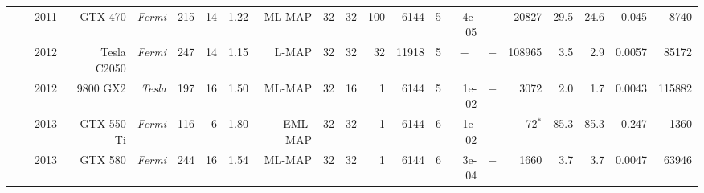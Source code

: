 \begin{table}
\begin{adjustbox}{angle=90}
{{\begin{tabular}{|r|r|r||r|r|r|r|r|r|r|r|r|r|r||r|r|r|r||r|r|r|}
                                                                 & \cite{Wu2011}                         & 2011                  & GTX 470                  & \textit{Fermi}                   & 215                  & 14                 & 1.22                   &  ML-MAP                  & 32                  & 32                  & 100                 & 6144                  & 5                  & 4e-05                         & \multicolumn{1}{c|}{$-$} &  20827        &   29.5           &  24.6          & 0.045         &   8740             \\ \cline{2-21}
                                                                 & \cite{Chinnici2012}                   & 2012                  & Tesla C2050              & \textit{Fermi}                   & 247                  & 14                 & 1.15                   &   L-MAP                  & 32                  & 32                  & 32                  & 11918                 & 5                  & \multicolumn{1}{c|}{$-$}      & \multicolumn{1}{c|}{$-$} & 108965        &    3.5           &   2.9          & 0.0057        &  85172             \\ \cline{2-21}
                                                                 & \cite{Yoge2012}                       & 2012                  & 9800 GX2                 & \textit{Tesla}                   & 197                  & 16                 & 1.50                   &  ML-MAP                  & 32                  & 16                  & 1                   & 6144                  & 5                  & 1e-02                         & \multicolumn{1}{c|}{$-$} &   3072        &    2.0           &   1.7          & 0.0043        & 115882             \\ \cline{2-21}
                                                                 & \cite{Liu2013}                        & 2013                  & GTX 550 Ti               & \textit{Fermi}                   & 116                  & 6                  & 1.80                   & EML-MAP                  & 32                  & 32                  & 1                   & 6144                  & 6                  & 1e-02                         & \multicolumn{1}{c|}{$-$} &     72$^*$    &   85.3           &  85.3          & 0.247         &   1360             \\ \cline{2-21}
                                                                 & \cite{Chen2013}                       & 2013                  & GTX 580                  & \textit{Fermi}                   & 244                  & 16                 & 1.54                   &  ML-MAP                  & 32                  & 32                  & 1                   & 6144                  & 6                  & 3e-04                         & \multicolumn{1}{c|}{$-$} &   1660        &    3.7           &   3.7          & 0.0047        &  63946             \\ \cline{2-21}

\end{tabular}}}
\end{adjustbox}
\end{table}
